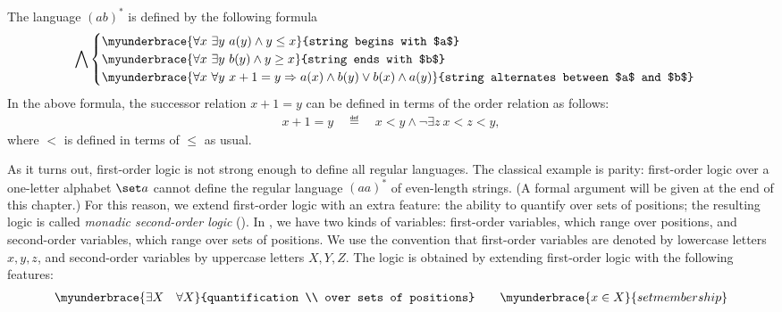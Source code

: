 \begin{myexample}\label{ex:logic-ab-star}
    The language $(ab)^*$ is defined by the following formula 
\begin{align*}
\bigwedge
\begin{cases}
    \myunderbrace{\forall x \ \exists y \ a(y) \land y \leq x}{string begins with $a$} \\ 
    \myunderbrace{\forall x \ \exists y \ b(y) \land y \geq x}{string ends with $b$} \\
    \myunderbrace{\forall x \ \forall y \ x + 1 = y \Rightarrow a(x) \land b(y) \lor b(x) \land a(y)}{string alternates between $a$ and $b$}
\end{cases}
\end{align*}
In the above formula, the successor relation $x+1 = y$ can be defined in terms of the order relation as follows:
\begin{align*}x + 1 = y \quad \eqdef \quad x < y \land \neg \exists z \ x < z < y,\end{align*}
where $<$ is defined in terms of $\leq$ as usual.
\end{myexample}

As it turns out, first-order logic is not strong enough to define all regular languages. The classical example is parity: first-order logic over a one-letter alphabet $\set a$ cannot define  the regular language $(aa)^*$ of even-length strings. (A formal argument will be given at the end of this chapter.)  For this reason, we extend first-order logic with an extra feature: the ability to quantify over sets of positions; the resulting logic is called \emph{monadic second-order logic} (\mso). In \mso, we have two  kinds of variables: first-order variables, which range over positions, and second-order variables, which range over sets of positions.  We use the convention that first-order variables are denoted by lowercase letters $x, y, z$, and second-order variables by uppercase letters $X, Y, Z$. The logic \mso is obtained by extending first-order logic with the following features:
\begin{align*}
\myunderbrace{\exists X \quad \forall X}{quantification \\ over sets of positions}
\qquad 
\myunderbrace{x \in X }{set membership}
\end{align*}


